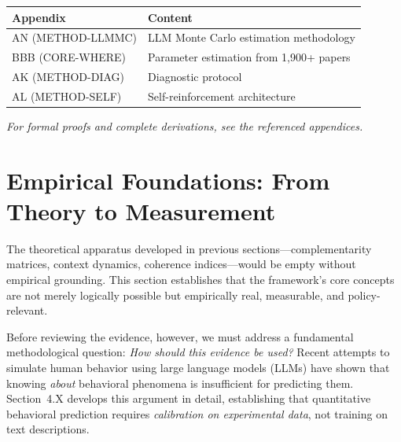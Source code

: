 \begin{tcolorbox}[
    colback=yellow!10!white,
    colframe=orange!75!black,
    title={\textbf{Appendix References for This Chapter}},
    fonttitle=\bfseries
]
\small
\begin{tabular}{@{}lp{8cm}@{}}
\textbf{Appendix} & \textbf{Content} \\
\midrule
AN (METHOD-LLMMC) & LLM Monte Carlo estimation methodology \\
BBB (CORE-WHERE) & Parameter estimation from 1,900+ papers \\
AK (METHOD-DIAG) & Diagnostic protocol \\
AL (METHOD-SELF) & Self-reinforcement architecture \\
\end{tabular}

\medskip
\textit{For formal proofs and complete derivations, see the referenced appendices.}
\end{tcolorbox}

\section{Empirical Foundations: From Theory to Measurement}
\label{sec:empiricalfoundations}


The theoretical apparatus developed in previous sections---complementarity matrices,
context dynamics, coherence indices---would be empty without empirical grounding.
This section establishes that the framework's core concepts are not merely
logically possible but empirically real, measurable, and policy-relevant.

Before reviewing the evidence, however, we must address a fundamental methodological
question: \emph{How should this evidence be used?} Recent attempts to simulate human
behavior using large language models (LLMs) have shown that knowing \emph{about}
behavioral phenomena is insufficient for predicting them. Section~4.X develops
this argument in detail, establishing that quantitative behavioral prediction
requires \emph{calibration on experimental data}, not training on text descriptions.

